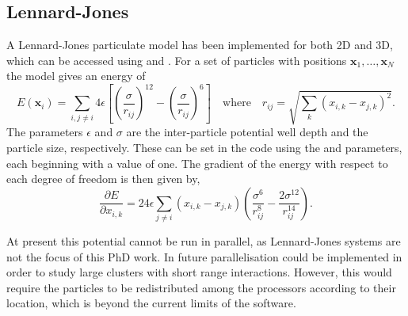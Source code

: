 \subsection{Lennard-Jones}
A Lennard-Jones particulate model has been implemented for both 2D and 3D, which can be accessed using  and .
For a set of particles with positions ${\bm{x}_1, \ldots, \bm{x}_N}$ the model gives an energy of
\begin{equation}
  E(\bm{x}_i) = \sum_{i, j \ne i} 4 \epsilon \left[ \left(\frac{\sigma}{r_{ij}}\right)^{12} - \left(\frac{\sigma}{r_{ij}}\right)^{6} \right] \quad \text{where} \quad r_{ij} = \sqrt{\sum_k (x_{i,k} - x_{j,k})^2}.
  \label{eq:ell-lj}
\end{equation}
The parameters $\epsilon$ and $\sigma$ are the inter-particle potential well depth and the particle size, respectively.
These can be set in the code using the  and  parameters, each beginning with a value of one.
The gradient of the energy with respect to each degree of freedom is then given by,
\begin{equation}
  \frac{\partial E}{\partial x_{i,k}} = 24 \epsilon \sum_{j \ne i} (x_{i,k} - x_{j,k}) \left( \frac{\sigma^{6}}{r_{ij}^{8}} - \frac{2\sigma^{12}}{r_{ij}^{14}} \right).
\end{equation}

At present this potential cannot be run in parallel, as Lennard-Jones systems are not the focus of this PhD work.
In future parallelisation could be implemented in order to study large clusters with short range interactions.
However, this would require the particles to be redistributed among the processors according to their location, which is beyond the current limits of the software.


